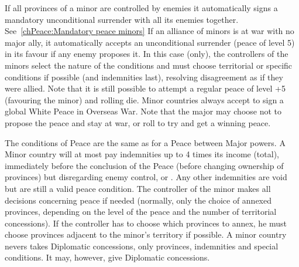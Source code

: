 \label{chPeace:automatic peace minor}
\bparag If all provinces of a minor are controlled by enemies it automatically
signs a mandatory unconditional surrender with all its enemies together.
See~\ref{chPeace:Mandatory peace minors}
\bparag If an alliance of minors is at war with no major ally, it
automatically accepts an unconditional surrender (peace of level 5) in its
favour if any enemy proposes it. In this case (only), the controllers of the
minors select the nature of the conditions and must choose territorial or
specific conditions if possible (and indemnities last), resolving disagreement
as if they were allied. Note that it is still possible to attempt a regular
peace of level +5 (favouring the minor) and rolling die.
\bparag Minor countries always accept to sign a global White Peace in Overseas
War. Note that the major may choose not to propose the peace and stay at war,
or roll to try and get a winning peace.

\bparag The conditions of Peace are the same as for a Peace between Major
powers.
\bparag A Minor country will at most pay indemnities up to 4 times its income
(total), immediately before the conclusion of the Peace (before changing
ownership of provinces) but disregarding enemy control, \REVOLT or
\PILLAGE. Any other indemnities are void but are still a valid peace
condition.
\bparag The controller of the minor makes all decisions concerning peace if
needed (normally, only the choice of annexed provinces, depending on the level
of the peace and the number of territorial concessions). If the controller has
to choose which provinces to annex, he must choose provinces adjacent to the
minor's territory if possible.
\bparag A minor country nevers takes Diplomatic concessions, only provinces,
indemnities and special conditions. It may, however, give Diplomatic
concessions.

